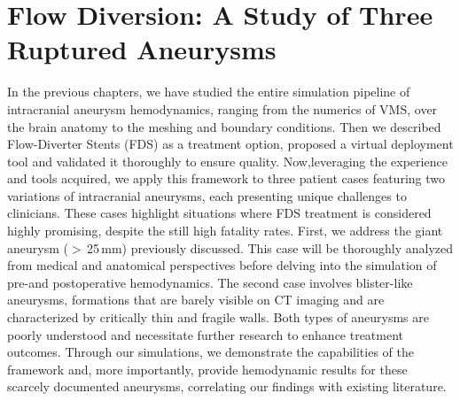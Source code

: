 \newpage
\pagestyle{fancy}

\chapter{Flow Diversion: A Study of Three Ruptured Aneurysms}\minitoc\newpage\label{chap.5}
\begin{tcolorbox}[abstract]

	In the previous chapters, we have studied the entire simulation pipeline of intracranial aneurysm hemodynamics, ranging from the numerics of VMS, over the brain anatomy to the meshing and boundary conditions. Then we described Flow-Diverter Stents (FDS) as a treatment option, proposed a virtual deployment tool and validated it thoroughly to ensure quality.	Now,leveraging the experience and tools acquired, we apply this framework to three patient cases featuring two variations of intracranial aneurysms, each presenting unique challenges to clinicians. These cases highlight situations where FDS treatment is considered highly promising, despite the still high fatality rates. First, we address the giant aneurysm ($>$\,25\,mm) previously discussed. This case will be thoroughly analyzed from medical and anatomical perspectives before delving into the simulation of pre-and postoperative hemodynamics. The second case involves blister-like aneurysms, formations that are barely visible on CT imaging and are characterized by critically thin and fragile walls. Both types of aneurysms are poorly understood and necessitate further research to enhance treatment outcomes. Through our simulations, we demonstrate the capabilities of the framework and, more importantly, provide hemodynamic results for these scarcely documented aneurysms, correlating our findings with existing literature.

	\tcblower


\end{tcolorbox}
